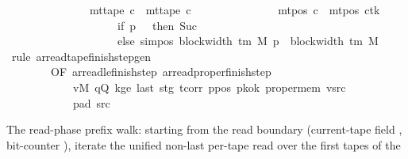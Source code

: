 \begin{isabellebody}
\ \ \ \ \ \ \ \ \ \ \ \ \ \ {\isasymand}\ mt{\isacharunderscore}{\kern0pt}tape\ c{\isacharprime}{\kern0pt}{\isacharprime}{\kern0pt}\ {\isacharequal}{\kern0pt}\ mt{\isacharunderscore}{\kern0pt}tape\ c{\isacharprime}{\kern0pt}\isanewline
\ \ \ \ \ \ \ \ \ \ \ \ \ \ {\isasymand}\ mt{\isacharunderscore}{\kern0pt}pos\ c{\isacharprime}{\kern0pt}{\isacharprime}{\kern0pt}\ {\isacharequal}{\kern0pt}\ {\isacharparenleft}{\kern0pt}mt{\isacharunderscore}{\kern0pt}pos\ c{\isacharprime}{\kern0pt}{\isacharparenright}{\kern0pt}{\isacharparenleft}{\kern0pt}tk\ {\isacharcolon}{\kern0pt}{\isacharequal}{\kern0pt}\isanewline
\ \ \ \ \ \ \ \ \ \ \ \ \ \ \ \ \ \ \ \ if\ p\ {\isacharequal}{\kern0pt}\ {}\ then\ Suc\ {}\isanewline
\ \ \ \ \ \ \ \ \ \ \ \ \ \ \ \ \ \ \ \ else\ sim{\isacharunderscore}{\kern0pt}pos\ {\isacharparenleft}{\kern0pt}block{\isacharunderscore}{\kern0pt}width\ {\isacharparenleft}{\kern0pt}{\isasymGamma}{\isacharunderscore}{\kern0pt}tm\ M{\isacharparenright}{\kern0pt}{\isacharparenright}{\kern0pt}\ p\ {\isacharplus}{\kern0pt}\ block{\isacharunderscore}{\kern0pt}width\ {\isacharparenleft}{\kern0pt}{\isasymGamma}{\isacharunderscore}{\kern0pt}tm\ M{\isacharparenright}{\kern0pt}{\isacharparenright}{\kern0pt}{\isachardoublequoteclose}\isanewline
%
\isadelimproof
\ \ %
\endisadelimproof
%
\isatagproof
{}\isamarkupfalse%
\ {\isacharparenleft}{\kern0pt}rule\ ar{\isacharunderscore}{\kern0pt}read{\isacharunderscore}{\kern0pt}tape{\isacharunderscore}{\kern0pt}finish{\isacharunderscore}{\kern0pt}step{\isacharunderscore}{\kern0pt}gen\isanewline
\ \ \ \ \ \ \ \ {\isacharbrackleft}{\kern0pt}OF\ ar{\isacharunderscore}{\kern0pt}read{\isacharunderscore}{\kern0pt}le{\isacharunderscore}{\kern0pt}finish{\isacharunderscore}{\kern0pt}step\ ar{\isacharunderscore}{\kern0pt}read{\isacharunderscore}{\kern0pt}proper{\isacharunderscore}{\kern0pt}finish{\isacharunderscore}{\kern0pt}step\isanewline
\ \ \ \ \ \ \ \ \ \ \ \ vM\ qQ\ kge{}\ last\ stg\ tcorr\ ppos\ pkok\ proper{\isacharunderscore}{\kern0pt}mem\ vsrc\isanewline
\ \ \ \ \ \ \ \ \ \ \ \ pad{}\ src{}{\isacharbrackright}{\kern0pt}{\isacharparenright}{\kern0pt}%
\endisatagproof
{\isafoldproof}%
%
\isadelimproof
%
\endisadelimproof
%
\begin{isamarkuptext}%
The read-phase prefix walk: starting from the read boundary
  (current-tape field , bit-counter
  ), iterate the unified non-last per-tape read
   over the first  tapes of the

\end{isamarkuptext}
\end{isabellebody}
